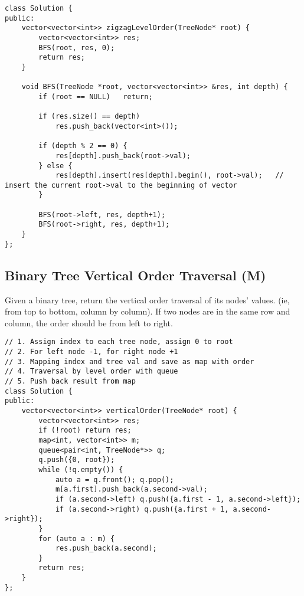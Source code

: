 \begin{lstlisting}
class Solution {
public:
    vector<vector<int>> zigzagLevelOrder(TreeNode* root) {
        vector<vector<int>> res;
        BFS(root, res, 0);
        return res;
    }
    
    void BFS(TreeNode *root, vector<vector<int>> &res, int depth) {
        if (root == NULL)   return;
        
        if (res.size() == depth)
            res.push_back(vector<int>());  

        if (depth % 2 == 0) {                                   
            res[depth].push_back(root->val);
        } else {                                                
            res[depth].insert(res[depth].begin(), root->val);   // insert the current root->val to the beginning of vector
        }
        
        BFS(root->left, res, depth+1);  
        BFS(root->right, res, depth+1);
    }
};
\end{lstlisting}


\subsection{Binary Tree Vertical Order Traversal (M)}
Given a binary tree, return the vertical order traversal of its nodes' values. (ie, from top to bottom, column by column). If two nodes are in the same row and column, the order should be from left to right.\\

\begin{lstlisting}
// 1. Assign index to each tree node, assign 0 to root
// 2. For left node -1, for right node +1
// 3. Mapping index and tree val and save as map with order
// 4. Traversal by level order with queue
// 5. Push back result from map
class Solution {
public:
    vector<vector<int>> verticalOrder(TreeNode* root) {
        vector<vector<int>> res;
        if (!root) return res;
        map<int, vector<int>> m;
        queue<pair<int, TreeNode*>> q;
        q.push({0, root});
        while (!q.empty()) {
            auto a = q.front(); q.pop();
            m[a.first].push_back(a.second->val);
            if (a.second->left) q.push({a.first - 1, a.second->left});
            if (a.second->right) q.push({a.first + 1, a.second->right});
        }
        for (auto a : m) {
            res.push_back(a.second);
        }
        return res;
    }
};
\end{lstlisting}


